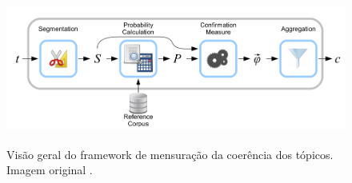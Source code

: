 \documentclass[12pt,a4paper]{article}
\begin{document}
\begin{figure}[H]
	\centering
    \includegraphics[height=5cm]{images/figure_3.png}
    \caption{Visão geral do framework de mensuração da coerência dos tópicos. Imagem original .}
    \label{fig-proc}

\end{figure}
\end{document}
